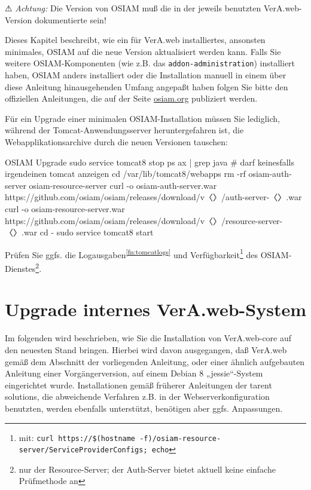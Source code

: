 ⚠ \emph{Achtung:} Die Version von OSIAM muß die in der jeweils
benutzten VerA.web-Version dokumentierte sein!

Dieses Kapitel beschreibt, wie ein für VerA.web installiertes,
ansonsten minimales, OSIAM auf die neue Version aktualisiert
werden kann. Falls Sie weitere OSIAM-Komponenten (wie z.B.
das \texttt{addon-administration}) installiert haben, OSIAM
anders installiert oder die Installation manuell in einem
über diese Anleitung hinausgehenden Umfang angepaßt haben
folgen Sie bitte den offiziellen Anleitungen, die auf der
Seite \href{http://osiam.org/}{osiam.org} publiziert werden.

\begin{minipage}{\linewidth}
Für ein Upgrade einer minimalen OSIAM-Installation müssen Sie
lediglich, während der Tomcat-Anwendungsserver heruntergefahren
ist, die Webapplikationsarchive durch die neuen Versionen tauschen:

\begin{lstdump}{OSIAM Upgrade}
sudo service tomcat8 stop
ps ax | grep java # darf keinesfalls irgendeinen tomcat anzeigen
cd /var/lib/tomcat8/webapps
rm -rf osiam-auth-server osiam-resource-server
curl -o osiam-auth-server.war https://github.com/osiam/osiam/releases/download/v〈\lstdumpesc{\vwiaversosiam}〉/auth-server-〈\lstdumpesc{\vwiaversosiam}〉.war
curl -o osiam-resource-server.war https://github.com/osiam/osiam/releases/download/v〈〉/resource-server-〈〉.war
cd -
sudo service tomcat8 start
\end{lstdump}
\end{minipage}

Prüfen Sie ggfs. die Logausgaben\Hair\textsuperscript{\ref{fn:tomcatlogs}}
und Verfügbarkeit\Hair\footnote{\label{fn:osiamcheck}mit:
\texttt{curl https://\$(hostname -f)/osiam-resource-server/ServiceProviderConfigs; echo}%
} des OSIAM-Dienstes\Hair\footnote{\label{fn:osiamsvcchk}nur der
Resource-Server; der Auth-Server bietet aktuell keine einfache Prüfmethode an}.

\fi%

\section{Upgrade internes VerA.web-System}\label{sec:upgrade-int}

Im folgenden wird beschrieben, wie Sie die Installation von
VerA.web-core auf den neuesten Stand bringen.
Hierbei wird davon ausgegangen, daß VerA.web gemäß
  dem Abschnitt  der vorliegenden Anleitung,
  oder einer ähnlich aufgebauten Anleitung einer Vorgängerversion,
auf einem Debian 8 „jessie“-System eingerichtet
wurde. Installationen gemäß früherer Anleitungen der tarent solutions,
die abweichende Verfahren z.B. in der Webserverkonfiguration benutzten,
werden ebenfalls unterstützt, benötigen aber ggfs. Anpassungen.

